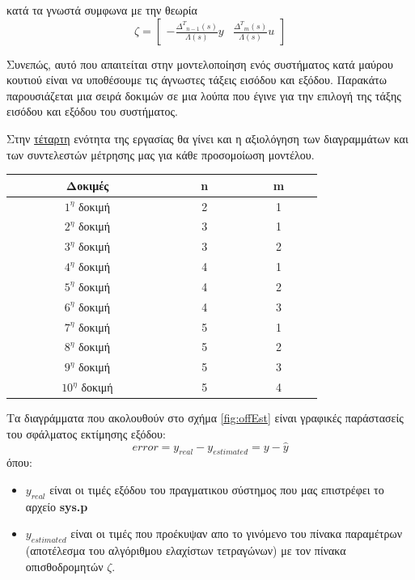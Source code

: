 \documentclass{article}
\begin{document}
κατά τα γνωστά συμφωνα με την θεωρία
\begin{equation*}
\zeta = \begin{bmatrix}
-\frac{{Δ^{Τ}}_{n-1}(s)}{Λ(s)}  y & \frac{{Δ^{Τ}}_{m}(s)}{Λ(s)}u  
\end{bmatrix}
\end{equation*}

Συνεπώς, αυτό που απαιτείται στην μοντελοποίηση ενός συστήματος κατά μαύρου κουτιού είναι να υποθέσουμε τις άγνωστες τάξεις εισόδου και εξόδου.
Παρακάτω παρουσιάζεται μια σειρά δοκιμών σε μια λούπα που έγινε για την επιλογή της τάξης εισόδου και εξόδου του συστήματος.
\par Στην \hyperref[sec:validation]{τέταρτη} ενότητα της εργασίας θα γίνει και η αξιολόγηση των διαγραμμάτων και των συντελεστών μέτρησης μας για κάθε προσομοίωση μοντέλου. 
\begin{center}
\begin{tabular}{ |c|c|c| } 
 \hline
$\qquad$ $\qquad$ Δοκιμές $\qquad$ $\qquad$ &$\qquad$ n $\qquad$& $\qquad$ m $\qquad$ \\ 
  \hline
 $1^{η}$ δοκιμή & 2 & 1 \\ 
  \hline
  $2^{η}$ δοκιμή & 3 & 1 \\ 
  \hline
   $3^{η}$ δοκιμή & 3 & 2 \\ 
  \hline
   $4^{η}$ δοκιμή & 4 & 1 \\ 
  \hline
   $5^{η}$ δοκιμή & 4 & 2 \\ 
  \hline
   $6^{η}$ δοκιμή & 4 & 3 \\ 
  \hline
  $7^{η}$ δοκιμή & 5 & 1 \\ 
  \hline
  $8^{η}$ δοκιμή & 5 & 2 \\ 
  \hline
  $9^{η}$ δοκιμή & 5 & 3 \\ 
  \hline
  $10^{η}$ δοκιμή & 5 & 4 \\ 
  \hline
\end{tabular}
\end{center}
\par Τα διαγράμματα που ακολουθούν στο σχήμα \ref{fig:offEst} είναι γραφικές παράστασείς του σφάλματος εκτίμησης εξόδου:
\begin{equation*}
error = y_{real} - y_{estimated} = y - \hat{y}
\end{equation*}
όπου: 
\begin{itemize}
\item $y_{real}$ είναι οι τιμές εξόδου του πραγματικου σύστημος που μας επιστρέφει το αρχείο \textbf{sys.p}
\item $y_{estimated}$ είναι οι τιμές που προέκυψαν απο το γινόμενο του πίνακα παραμέτρων (αποτέλεσμα του αλγόριθμου ελαχίστων τετραγώνων) με τον πίνακα οπισθοδρομητών $\zeta$.   
\end{itemize}
\end{document}
